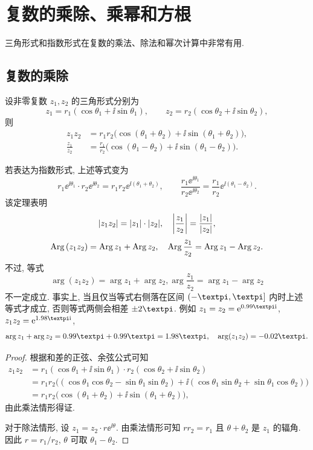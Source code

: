 \section{复数的乘除、乘幂和方根}

三角形式和指数形式在复数的乘法、除法和幂次计算中非常有用.

\subsection{复数的乘除}

\begin{theorem}
  \label{thm:multiply}
  设非零复数 $z_1,z_2$ 的三角形式分别为
  \[
    z_1=r_1(\cos\theta_1+\ii\sin\theta_1),\qquad
    z_2=r_2(\cos\theta_2+\ii\sin\theta_2),
  \]
  则
  \begin{align*}
     z_1z_2&
    =r_1r_2\bigl(\cos(\theta_1+\theta_2)+\ii\sin(\theta_1+\theta_2)\bigr),\\
     \frac{z_1}{z_2}&
    =\frac{r_1}{r_2}\bigl(\cos(\theta_1-\theta_2)+\ii\sin(\theta_1-\theta_2)\bigr).
  \end{align*}
\end{theorem}

若表达为指数形式, 上述等式变为
  \[
    r_1\ee^{\ii\theta_1}\cdot r_2\ee^{\ii\theta_2}=r_1r_2\ee^{\ii(\theta_1+\theta_2)},\qquad
    \frac{r_1\ee^{\ii\theta_1}}{r_2\ee^{\ii\theta_2}}=\frac{r_1}{r_2}\ee^{\ii(\theta_1-\theta_2)}.
  \]
该定理表明
\[
  \lvert z_1z_2\rvert=\lvert z_1\rvert\cdot\lvert z_2\rvert,\quad
  \biggl\vert\frac{z_1}{z_2}\biggr\vert=\frac{\lvert z_1\rvert}{\lvert z_2\rvert},
\]
\begin{equation}
  \label{eq:Arg-multiply-divide-equality}
  \operatorname{Arg}{(z_1z_2)}=\operatorname{Arg} z_1+\operatorname{Arg} z_2,\quad
  \operatorname{Arg}{\frac{z_1}{z_2}}=\operatorname{Arg} z_1-\operatorname{Arg} z_2.
\end{equation}
不过, 等式
\[
  \arg{(z_1z_2)}=\arg z_1+\arg z_2, \arg{\dfrac{z_1}{z_2}}=\arg z_1-\arg z_2
\]
\alert{不一定成立}.
事实上, 当且仅当等式右侧落在区间 $(-\cpi,\cpi]$ 内时上述等式才成立, 否则等式两侧会相差 $\pm2\cpi$.
例如 $z_1=z_2=\ee^{0.99\cpi \ii}$, $z_1z_2=\ee^{1.98\cpi \ii}$,
\[
  \arg z_1+\arg z_2=0.99\cpi+0.99\cpi=1.98\cpi,\quad
  \arg(z_1z_2)=-0.02\cpi.
\]

\begin{proof}
  根据和差的正弦、余弦公式可知
  \begin{align*}
     z_1z_2&
    =r_1(\cos\theta_1+\ii\sin\theta_1)\cdot
     r_2(\cos\theta_2+\ii\sin\theta_2)\\&
    =r_1r_2\bigl(
       (\cos\theta_1\cos\theta_2-\sin\theta_1\sin\theta_2)
    +\ii(\cos\theta_1\sin\theta_2+\sin\theta_1\cos\theta_2)
     \bigr)\\&
    =r_1r_2\bigl(
      \cos(\theta_1+\theta_2)+\ii\sin(\theta_1+\theta_2)
     \bigr),
  \end{align*}
  由此乘法情形得证.

  对于除法情形, 设 $z_1=z_2\cdot r\ee^{\ii\theta}$.
  由乘法情形可知 $rr_2=r_1$ 且 $\theta+\theta_2$ 是 $z_1$ 的辐角.
  因此 $r=r_1/r_2$, $\theta$ 可取 $\theta_1-\theta_2$.
\end{proof}


